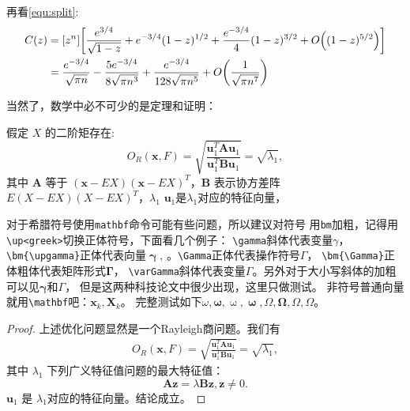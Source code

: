 再看\ref{equ:split}:
\begin{equation}\label{equ:split}
\begin{split}
C(z) &= [z^n] \biggl[\frac{e^{3/4}}{\sqrt{1-z}} +
e^{-3/4}(1-z)^{1/2} + \frac{e^{-3/4}}{4}(1-z)^{3/2}
+ O\Bigl( (1-z)^{5/2}\Bigr)\biggr] \\
&= \frac{e^{-3/4}}{\sqrt{\pi n}} - \frac{5e^{-3/4}}{8\sqrt{\pi
n^3}} + \frac{e^{-3/4}}{128 \sqrt{\pi n^5}} +
O\biggl(\frac{1}{\sqrt{\pi
n^7}}\biggr)
\end{split}
\end{equation}

当然了，数学中必不可少的是定理和证明：
\begin{theorem}
  \label{chapTSthm:rayleigh solution}
  假定 $X$ 的二阶矩存在:
  \begin{equation}
         O_R(\mathbf{x},F)=\sqrt{\frac{\mathbf{u}_1^T\mathbf{A}\mathbf{u}_1} {\mathbf{u}_1^T\mathbf{B}\mathbf{u}_1}}=\sqrt{\lambda_1},
  \end{equation}
  其中 $\mathbf{A}$ 等于 $(\mathbf{x}-EX)(\mathbf{x}-EX)^T$，$\mathbf{B}$ 表示协方差阵 $E(X-EX)(X-EX)^T$，$\lambda_1$
$\mathbf{u}_1$是$\lambda_1$对应的特征向量，
\end{theorem}

对于希腊符号使用\verb|mathbf|命令可能有些问题，所以建议对符号
用\verb|bm|加粗，记得用\verb|\up<greek>|切换正体符号，下面看几个例子：
\verb|\gamma|斜体代表变量$\gamma$，\verb|\bm{\upgamma}|正体代表向量$\bm{\upgamma}$,
。\verb|\Gamma|正体代表操作符号$\Gamma$，
\verb|\bm{\Gamma}|正体粗体代表矩阵形式$\bm{\Gamma}$，
\verb|\varGamma|斜体代表变量$\varGamma$。另外对于大小写斜体的加粗可以见$\bm{\gamma}$和$\bm{\varGamma}$，
但是这两种科技论文中很少出现，这里只做测试。
非符号普通向量就用\verb|\mathbf|吧：$\mathbf{x}_k,\mathbf{X}_k$。
完整测试如下$\omega,\bm{\omega},\upomega,\bm{\upomega},\Omega,\bm{\Omega},\varOmega,\bm{\varOmega}$。

\begin{proof}
上述优化问题显然是一个Rayleigh商问题。我们有
  \begin{align}
     O_R(\mathbf{x},F)=\sqrt{\frac{\mathbf{u}_1^T\mathbf{A}\mathbf{u}_1} {\mathbf{u}_1^T\mathbf{B}\mathbf{u}_1}}=\sqrt{\lambda_1},
 \end{align}
 其中 $\lambda_1$ 下列广义特征值问题的最大特征值：
$$
\mathbf{A}\mathbf{z}=\lambda\mathbf{B}\mathbf{z}, \mathbf{z}\neq 0.
$$
 $\mathbf{u}_1$ 是 $\lambda_1$对应的特征向量。结论成立。
\end{proof}


